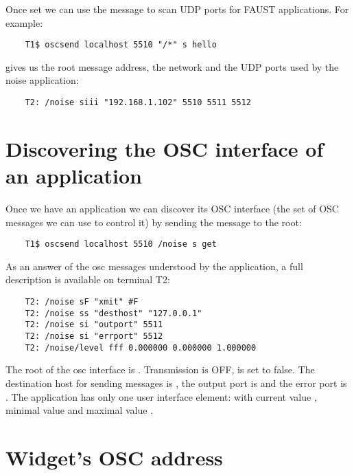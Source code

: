 Once set we can use the  message  to scan UDP ports for FAUST applications. For example:
\begin{lstlisting}
	T1$ oscsend localhost 5510 "/*" s hello
\end{lstlisting}

gives us the root message address, the network and the UDP ports used by the noise application:
\begin{lstlisting}
	T2: /noise siii "192.168.1.102" 5510 5511 5512
\end{lstlisting}


\section{Discovering the OSC interface of an application}

Once we have an application we can discover its OSC interface (the set of OSC messages we can use to control it) by sending the  message to the root:
\begin{lstlisting}
	T1$ oscsend localhost 5510 /noise s get 
\end{lstlisting}

As an answer of the osc messages  understood by the application, a full description is available on terminal T2:
\begin{lstlisting}
	T2: /noise sF "xmit" #F
	T2: /noise ss "desthost" "127.0.0.1"
	T2: /noise si "outport" 5511
	T2: /noise si "errport" 5512
	T2: /noise/level fff 0.000000 0.000000 1.000000
\end{lstlisting}

The root of the osc interface is . Transmission is OFF,  is set to false. The destination host for sending messages is , the output port is  and the error port is . The application has only one user interface element:  with current value , minimal value  and maximal value .

\section{Widget's OSC address}

